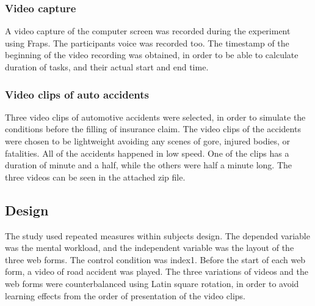 \documentclass[../main/Feedback.tex]{subfiles}
\begin{document}
\subsubsection{Video capture}
A video capture of the computer screen was recorded during the experiment using Fraps\cite{fraps}. The participants voice was recorded too. The timestamp of the beginning of the video recording was obtained, in order to be able to calculate duration of tasks, and their actual start and end time.
\subsubsection{Video clips of auto accidents}
Three video clips of automotive accidents were selected, in order to simulate the conditions before the filling of insurance claim. The video clips of the accidents were chosen to be lightweight avoiding any scenes of gore, injured bodies, or fatalities. All of the accidents happened in low speed. One of the clips has a duration of minute and a half, while the others were half a minute long. The three videos can be seen in the attached zip file.
\subsection{Design}
The study used repeated measures within subjects design. The depended variable was the mental workload, and the independent variable was the layout of the three web forms. The control condition was index1. Before the start of each web form, a video of road accident was played. The three variations of videos and the web forms were counterbalanced using Latin square rotation, in order to avoid learning effects from the order of presentation of the video clips.
\end{document}
